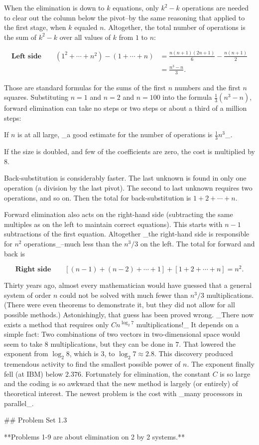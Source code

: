 When the elimination is down to \(k\) equations, only \(k^{2}-k\) operations are needed to clear out the column below the pivot--by the same reasoning that applied to the first stage, when \(k\) equaled \(n\). Altogether, the total number of operations is the sum of \(k^{2}-k\) over all values of \(k\) from \(1\) to \(n\):

\[\begin{split}\textbf{Left side}\qquad(1^{2}+\cdots+n^{2})-(1+ \cdots+n)&=\frac{n(n+1)(2n+1)}{6}-\frac{n(n+1)}{2}\\ &=\frac{n^{3}-n}{3}.\end{split}\]

Those are standard formulas for the sums of the first \(n\) numbers and the first \(n\) squares. Substituting \(n=1\) and \(n=2\) and \(n=100\) into the formula \(\frac{1}{3}(n^{3}-n)\), forward elimination can take no steps or two steps or about a third of a million steps:

If \(n\) is at all large, _a good estimate for the number of operations is \(\frac{1}{3}n^{3}\)_.

If the size is doubled, and few of the coefficients are zero, the cost is multiplied by \(8\).

Back-substitution is considerably faster. The last unknown is found in only one operation (a division by the last pivot). The second to last unknown requires two operations, and so on. Then the total for back-substitution is \(1+2+\cdots+n\).

Forward elimination also acts on the right-hand side (subtracting the same multiples as on the left to maintain correct equations). This starts with \(n-1\) subtractions of the first equation. Altogether _the right-hand side is responsible for \(n^{2}\) operations_--much less than the \(n^{3}/3\) on the left. The total for forward and back is

\[\textbf{Right side}\qquad[(n-1)+(n-2)+\cdots+1]+[1+2+\cdots+n]=n^{2}.\]

Thirty years ago, almost every mathematician would have guessed that a general system of order \(n\) could not be solved with much fewer than \(n^{3}/3\) multiplications. (There were even theorems to demonstrate it, but they did not allow for all possible methods.) Astonishingly, that guess has been proved wrong. _There now exists a method that requires only \(Cn^{\log_{2}7}\) multiplications!_ It depends on a simple fact: Two combinations of two vectors in two-dimensional space would seem to take \(8\) multiplications, but they can be done in \(7\). That lowered the exponent from \(\log_{2}8\), which is \(3\), to \(\log_{2}7\approx 2.8\). This discovery produced tremendous activity to find the smallest possible power of \(n\). The exponent finally fell (at IBM) below \(2.376\). Fortunately for elimination, the constant \(C\) is so large and the coding is so awkward that the new method is largely (or entirely) of theoretical interest. The newest problem is the cost with _many processors in parallel_.

## Problem Set 1.3

**Problems 1-9 are about elimination on 2 by 2 systems.** 